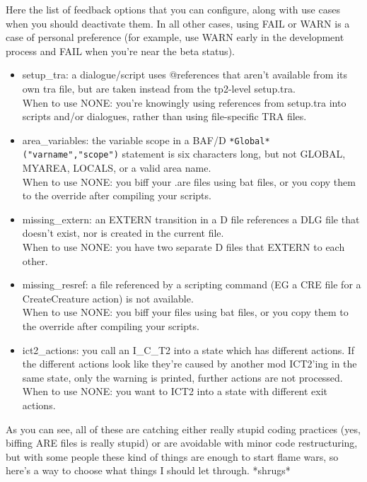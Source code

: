 \documentclass{article}
\begin{document}
Here the list of feedback options that you can configure, along with use cases when you
should deactivate them. In all other cases, using FAIL or WARN is a case of personal
preference (for example, use WARN early in the development process and FAIL when you're
near the beta status).
\begin{itemize}
\item setup_tra: a dialogue/script uses @references that aren't available from
     its own tra file, but are taken instead from the tp2-level setup.tra.
     \\
     When to use NONE: you're knowingly using references from
     setup.tra into scripts and/or dialogues, rather than using file-specific TRA files.
\item area_variables: the variable scope in a BAF/D \verb+*Global*("varname","scope")+
     statement is six characters long, but not GLOBAL, MYAREA, LOCALS, or a valid area name.
     \\
     When to use NONE: you biff your .are files using bat files, or you copy them to
		 the override after compiling your scripts.
\item missing_extern: an EXTERN transition in a D file references a DLG file that
     doesn't exist, nor is created in the current file.
     \\
     When to use NONE: you have two separate D files that EXTERN to each other.
\item missing_resref: a file referenced by a scripting command (EG a CRE file for a
     CreateCreature action) is not available.
     \\
     When to use NONE: you biff your files using bat files, or you copy them to
		 the override after compiling your scripts.
\item ict2_actions: you call an I_C_T2 into a state which has different actions.
		 If the different actions look like they're caused by another mod ICT2'ing in
		 the same state, only the warning is printed, further actions are not processed.
     \\
     When to use NONE: you want to ICT2 into a state with different exit actions.
\end{itemize}

As you can see, all of these are catching either really stupid coding practices
(yes, biffing ARE files is really stupid) or are avoidable with minor code
restructuring, but with some people these kind of things are enough to start flame wars,
so here's a way to choose what things I should let through. *shrugs*
\end{document}

